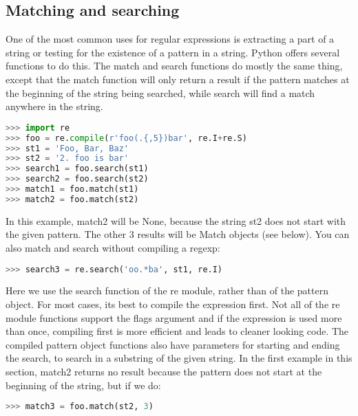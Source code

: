 \subsection{Matching and searching}
One of the most common uses for regular expressions is extracting a part of a
string or testing for the existence of a pattern in a string. Python offers
several functions to do this.  The match and search functions do mostly the same
thing, except that the match function will only return a result if the pattern
matches at the beginning of the string being searched, while search will find a
match anywhere in the string.
\lstset{basicstyle=\scriptsize, numbers=left, captionpos=b, tabsize=4}
\begin{lstlisting}[caption=Matching and searching,language={Python},
xleftmargin=15pt, label=lst:matchingandsearching]
>>> import re
>>> foo = re.compile(r'foo(.{,5})bar', re.I+re.S)
>>> st1 = 'Foo, Bar, Baz'
>>> st2 = '2. foo is bar'
>>> search1 = foo.search(st1)
>>> search2 = foo.search(st2)
>>> match1 = foo.match(st1)
>>> match2 = foo.match(st2)
\end{lstlisting}

In this example, match2 will be None, because the string st2 does not start with
the given pattern. The other 3 results will be Match objects (see below).  You
can also match and search without compiling a regexp:
\lstset{basicstyle=\scriptsize, numbers=left, captionpos=b, tabsize=4}
\begin{lstlisting}[caption=Search without compile 1,language={Python},
xleftmargin=15pt, label=lst:searchwithoutcompile1]
>>> search3 = re.search('oo.*ba', st1, re.I)
\end{lstlisting}

Here we use the search function of the re module, rather than of the pattern
object. For most cases, its best to compile the expression first. Not all of the
re module functions support the flags argument and if the expression is used
more than once, compiling first is more efficient and leads to cleaner looking
code.  The compiled pattern object functions also have parameters for starting
and ending the search, to search in a substring of the given string. In the
first example in this section, match2 returns no result because the pattern does
not start at the beginning of the string, but if we do:
\lstset{basicstyle=\scriptsize, numbers=left, captionpos=b, tabsize=4}
\begin{lstlisting}[caption=Search without compile 2,language={Python},
xleftmargin=15pt, label=lst:seachwithoutcompile2]
>>> match3 = foo.match(st2, 3)
\end{lstlisting}

